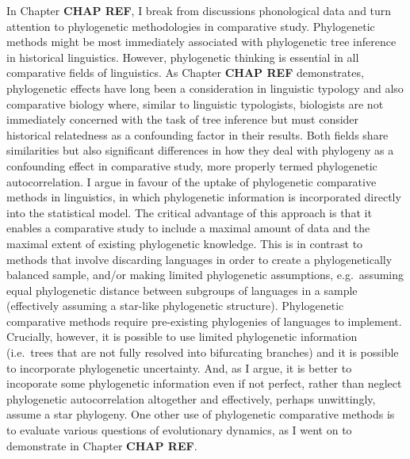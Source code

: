 In Chapter \textbf{CHAP REF}, I break from discussions phonological data and turn attention to phylogenetic methodologies in comparative study. Phylogenetic methods might be most immediately associated with phylogenetic tree inference in historical linguistics. However, phylogenetic thinking is essential in all comparative fields of linguistics. As Chapter \textbf{CHAP REF} demonstrates, phylogenetic effects have long been a consideration in linguistic typology and also comparative biology where, similar to linguistic typologists, biologists are not immediately concerned with the task of tree inference but must consider historical relatedness as a confounding factor in their results. Both fields share similarities but also significant differences in how they deal with phylogeny as a confounding effect in comparative study, more properly termed phylogenetic autocorrelation. I argue in favour of the uptake of phylogenetic comparative methods in linguistics, in which phylogenetic information is incorporated directly into the statistical model. The critical advantage of this approach is that it enables a comparative study to include a maximal amount of data and the maximal extent of existing phylogenetic knowledge. This is in contrast to methods that involve discarding languages in order to create a phylogenetically balanced sample, and/or making limited phylogenetic assumptions, e.g.~assuming equal phylogenetic distance between subgroups of languages in a sample (effectively assuming a star-like phylogenetic structure). Phylogenetic comparative methods require pre-existing phylogenies of languages to implement. Crucially, however, it is possible to use limited phylogenetic information (i.e.~trees that are not fully resolved into bifurcating branches) and it is possible to incorporate phylogenetic uncertainty. And, as I argue, it is better to incoporate some phylogenetic information even if not perfect, rather than neglect phylogenetic autocorrelation altogether and effectively, perhaps unwittingly, assume a star phylogeny. One other use of phylogenetic comparative methods is to evaluate various questions of evolutionary dynamics, as I went on to demonstrate in Chapter \textbf{CHAP REF}.

